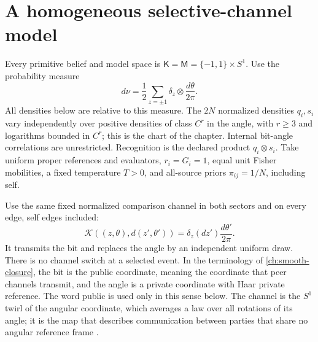 \section{A homogeneous selective-channel model}

Every primitive belief and model space is $\mathsf K=\mathsf M=\{-1,1\}\times S^1$. Use the probability measure
\begin{equation}
d\nu=\frac12\sum_{z=\pm1}\delta_z\otimes\frac{d\theta}{2\pi}.
\end{equation}
All densities below are relative to this measure. The $2N$ normalized densities $q_i,s_i$ vary independently over positive densities of class $C^r$ in the angle, with $r\ge3$ and logarithms bounded in $C^r$; this is the chart of the chapter. Internal bit-angle correlations are unrestricted. Recognition is the declared product $q_i\otimes s_i$. Take uniform proper references and evaluators, $r_i=G_i=1$, equal unit Fisher mobilities, a fixed temperature $T>0$, and all-source priors $\pi_{ij}=1/N$, including self.

Use the same fixed normalized comparison channel in both sectors and on every edge, self edges included:
\begin{equation}
\mathcal K((z,\theta),d(z',\theta'))
=\delta_z(dz')\frac{d\theta'}{2\pi}.
\label{open:channel}
\end{equation}
It transmits the bit and replaces the angle by an independent uniform draw. There is no channel switch at a selected event. In the terminology of \cref{ch:smooth-closure}, the bit is the public coordinate, meaning the coordinate that peer channels transmit, and the angle is a private coordinate with Haar private reference. The word public is used only in this sense below. The channel is the $S^1$ twirl of the angular coordinate, which averages a law over all rotations of its angle; it is the map that describes communication between parties that share no angular reference frame \citep{BartlettRudolphSpekkens2007}.

